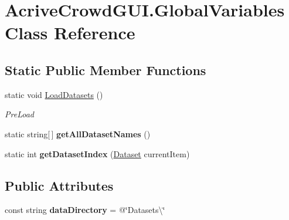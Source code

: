 \hypertarget{class_acrive_crowd_g_u_i_1_1_global_variables}{}\section{Acrive\+Crowd\+G\+U\+I.\+Global\+Variables Class Reference}
\label{class_acrive_crowd_g_u_i_1_1_global_variables}
\subsection*{Static Public Member Functions}
\begin{DoxyCompactItemize}
\item 
static void \hyperlink{class_acrive_crowd_g_u_i_1_1_global_variables_adc07f8396653ca15575ea917f9ddded1}{Load\+Datasets} ()
\begin{DoxyCompactList}\small\item\em Pre\+Load \end{DoxyCompactList}\item 
\hypertarget{class_acrive_crowd_g_u_i_1_1_global_variables_a24a5360839b7e5b7c125308f0e4fa923}{}static string\mbox{[}$\,$\mbox{]} {\bfseries get\+All\+Dataset\+Names} ()\label{class_acrive_crowd_g_u_i_1_1_global_variables_a24a5360839b7e5b7c125308f0e4fa923}

\item 
\hypertarget{class_acrive_crowd_g_u_i_1_1_global_variables_aff68f6d24e905a7124086eaeeaad3964}{}static int {\bfseries get\+Dataset\+Index} (\hyperlink{class_acrive_crowd_g_u_i_1_1_dataset}{Dataset} current\+Item)\label{class_acrive_crowd_g_u_i_1_1_global_variables_aff68f6d24e905a7124086eaeeaad3964}

\end{DoxyCompactItemize}
\subsection*{Public Attributes}
\begin{DoxyCompactItemize}
\item 
\hypertarget{class_acrive_crowd_g_u_i_1_1_global_variables_ade1aecb883d001fa8bdf63f56994e990}{}const string {\bfseries data\+Directory} = @\char`\"{}Datasets\textbackslash{}\char`\"{}\label{class_acrive_crowd_g_u_i_1_1_global_variables_ade1aecb883d001fa8bdf63f56994e990}

\end{DoxyCompactItemize}
